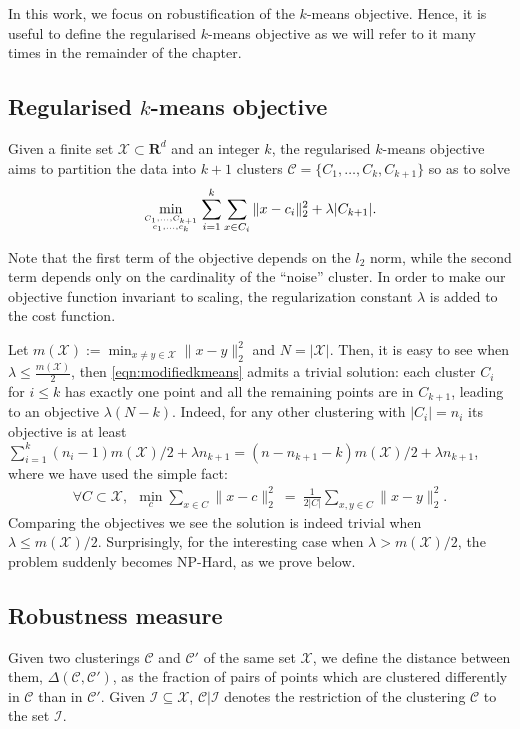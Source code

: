\documentclass[12pt]{article}
\newcommand{\mc}{\mathcal}
\newcommand{\mb}{\mathbf}
\begin{document}
In this work, we focus on robustification of the $k$-means objective. Hence, it is useful to define the regularised $k$-means objective as we will refer to it many times in the remainder of the chapter. 

\subsection{Regularised $k$-means objective}
Given a finite set $\mc X \subset \mb R^{d}$ and an integer $k$, the regularised $k$-means objective aims to partition the data into $k+1$ clusters $\mc C = \{C_1, \ldots, C_{k}, C_{k+1}\}$ so as to solve 
\begin{align}
	\min_{C_1,\ldots, C_{k+1} \atop c_1, \ldots, c_k} \sum_{i=1}^k \sum_{x \in C_i} \|x-c_i\|_2^2 + \lambda |C_{k+1}|.
	\label{eqn:modifiedkmeans}
\end{align}

Note that the first term of the objective depends on the $l_2$ norm, while the second term depends only on the cardinality of the ``noise'' cluster. In order to make our objective function invariant to scaling, the regularization constant $\lambda$ is added to the cost function. 

Let $m(\mc X) := \min_{x\ne y \in \mc X} \|x-y\|_2^2$ and $N = |\mc X|$. Then, it is easy to see when $\lambda \leq \frac{m(\mc X)}{2}$, then \eqref{eqn:modifiedkmeans} admits a trivial solution: each cluster $C_i$ for $i \leq k$ has exactly one point and all the remaining points are in $C_{k+1}$, leading to an objective $\lambda (N-k)$. Indeed, for any other clustering with $|C_i| = n_i$ its objective is at least $\sum_{i=1}^k (n_i-1) m(\mc X)/2 + \lambda n_{k+1} = (n-n_{k+1} - k) m(\mc X)/2 + \lambda n_{k+1}$, where we have used the simple fact:
\begin{align}
\forall C \subset \mc X, ~~
\min_{c} \sum_{x \in C} \|x - c\|_2^2 ~=~ \frac{1}{2|C|}\sum_{x, y \in C} \|x - y\|_2^2.
\end{align}
Comparing the objectives we see the solution is indeed trivial when $\lambda \leq m(\mc X) /2$. Surprisingly, for the interesting case when $\lambda > m(\mc X) /2$, the problem suddenly becomes NP-Hard, as we prove below.

\subsection{Robustness measure}
Given two clusterings $\mc C$ and $\mc C'$ of the same set $\mc X$, we define the distance between them, $\Delta(\mc C, \mc C')$, as the fraction of pairs of points which are clustered differently in $\mc C$ than in $\mc C'$. %
Given $\mc I \subseteq \mc X$, $\mc C|\mc I$ denotes the restriction of the clustering $\mc C$ to the set $\mc I$.
\end{document}
